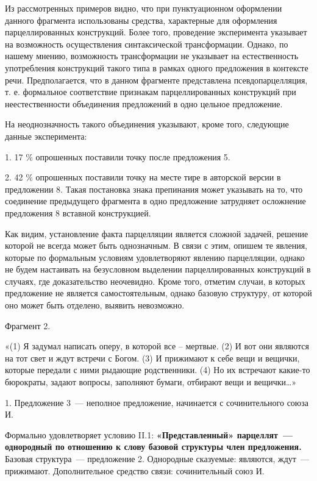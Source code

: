 \documentclass{kursa4}
\begin{document}
{      {}{Из
      рассмотренных примеров видно, что при пунктуационном оформлении данного
      фрагмента использованы средства, характерные для оформления
      парцеллированных конструкций. Более того, проведение эксперимента
      указывает на возможность осуществления синтаксической трансформации.
      Однако, по нашему мнению, возможность трансформации не указывает на
      естественность употребления конструкций такого типа в рамках одного
      предложения в контексте речи.
      }{Предполагается, что в данном фрагменте
      представлена псевдопарцелляция, т. е. формальное соответствие признакам
      парцеллированных конструкций при неестественности объединения
      предложений в одно цельное предложение. }

      {}{На
      неоднозначность такого объединения указывают, кроме того, следующие
      данные эксперимента:}

      {1. 17 \% опрошенных поставили точку
      после предложения 5.}

      {2. }{42 \%
      опрошенных поставили точку на месте тире в авторской версии в
      предложении 8. Такая постановка знака препинания может указывать на то,
      что соединение предыдущего фрагмента в одно предложение затрудняет
      осложнение предложения 8 вставной конструкцией. }

      {Как видим, установление факта
      парцелляции является сложной задачей, решение которой не всегда может
      быть однозначным. В связи с этим, опишем те явления, которые по
      формальным условиям удовлетворяют явлению парцелляции, однако не будем
      настаивать на безусловном выделении парцеллированных конструкций в
      случаях, где доказательство неочевидно. Кроме того, отметим случаи, в
      которых предложение не
      }{является}{
      самостоятельным, однако базовую структуру, от которой оно может быть
      отделено, выявить невозможно. }

      {Фрагмент 2. }

      {«(1) Я задумал написать оперу, в которой
      все – мертвые. (2) И вот они являются на тот свет и ждут встречи с
      Богом. (3) И прижимают к себе вещи и вещички, которые передали с ними
      рыдающие родственники. (4) Но их встречают какие-то бюрократы, задают
      вопросы, заполняют бумаги, отбирают вещи и вещички…»}

      {1. Предложение 3~--- неполное
      предложение, начинается с сочинительного союза И.}

      {Формально удовлетворяет условию II.1:
      }\textbf{{«Представленный» парцеллят~---
      однородный по отношению к слову базовой структуры член предложения.
      }}{Базовая структура~--- предложение 2.
      Однородные сказуемые: являются, ждут~--- прижимают. Дополнительное
      средство связи: сочинительный союз И.}

}
\end{document}
